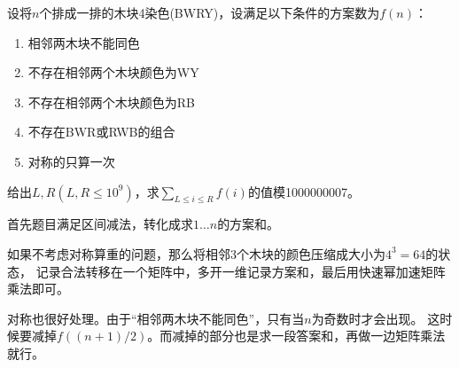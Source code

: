 \begin{prob}
	设将$n$个排成一排的木块4染色(BWRY)，设满足以下条件的方案数为$f(n)$：
	\begin{enumerate}
		\item 相邻两木块不能同色
		\item 不存在相邻两个木块颜色为WY
		\item 不存在相邻两个木块颜色为RB
		\item 不存在BWR或RWB的组合
		\item 对称的只算一次
	\end{enumerate}
	给出$L, R(L, R \le 10^9)$，求$\sum_{L \le i \le R} f(i)$的值模1000000007。
\end{prob}

\begin{sol}
	首先题目满足区间减法，转化成求$1 \ldots n$的方案和。\par
	如果不考虑对称算重的问题，那么将相邻3个木块的颜色压缩成大小为$4^3=64$的状态，
	记录合法转移在一个矩阵中，多开一维记录方案和，最后用快速幂加速矩阵乘法即可。\par
	对称也很好处理。由于“相邻两木块不能同色”，只有当$n$为奇数时才会出现。
	这时候要减掉$f((n+1)/2)$。而减掉的部分也是求一段答案和，再做一边矩阵乘法就行。
\end{sol}
